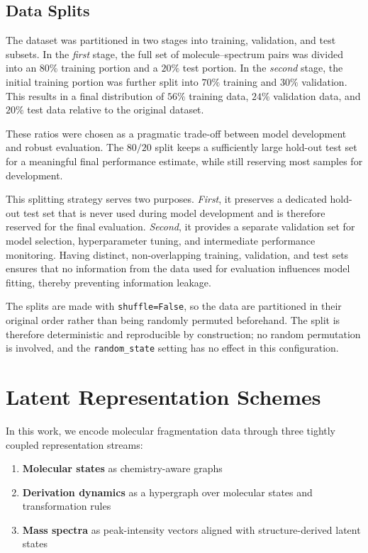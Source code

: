 \subsection{Data Splits}
\label{sec:data-splits}

The dataset was partitioned in two stages into training, validation, and test subsets.
In the \emph{first} stage, the full set of molecule--spectrum pairs was divided into an $80 \%$ training portion and a $20 \%$ test portion.
In the \emph{second} stage, the initial training portion was further split into $70 \%$ training and $30 \%$ validation.
This results in a final distribution of $56 \%$ training data, $24 \%$ validation data, and $20 \%$ test data relative to the original dataset.

These ratios were chosen as a pragmatic trade-off between model development and robust evaluation.
The $80/20$ split keeps a sufficiently large hold-out test set for a meaningful final performance estimate, while still reserving most samples for development.

This splitting strategy serves two purposes.
\emph{First}, it preserves a dedicated hold-out test set that is never used during model development and is therefore reserved for the final evaluation.
\emph{Second}, it provides a separate validation set for model selection, hyperparameter tuning, and intermediate performance monitoring.
Having distinct, non-overlapping training, validation, and test sets ensures that no information from the data used for evaluation influences model fitting, thereby preventing information leakage.

The splits are made with \texttt{shuffle=False}, so the data are partitioned in their original order rather than being randomly permuted beforehand.
The split is therefore deterministic and reproducible by construction; no random permutation is involved, and the \texttt{random\_state} setting has no effect in this configuration.

\section{Latent Representation Schemes}

In this work, we encode molecular fragmentation data through three tightly coupled representation streams:

\begin{enumerate}
    \item \textbf{Molecular states} as chemistry-aware graphs
    \item \textbf{Derivation dynamics} as a hypergraph over molecular states and transformation rules
    \item \textbf{Mass spectra} as peak-intensity vectors aligned with structure-derived latent states
\end{enumerate}

